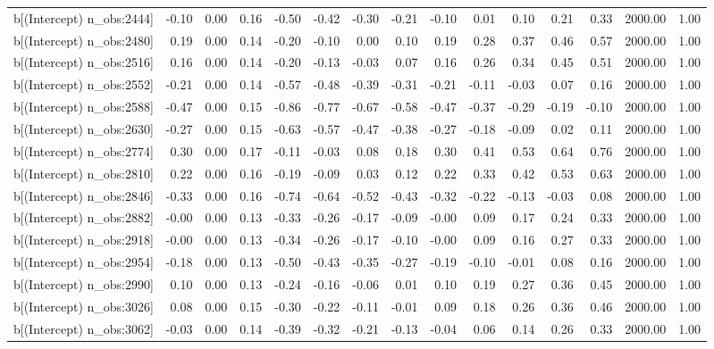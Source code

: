 \begin{table}[ht]
\begin{tabular}{rrrrrrrrrrrrrrr}
  b[(Intercept) n\_obs:2444] & -0.10 & 0.00 & 0.16 & -0.50 & -0.42 & -0.30 & -0.21 & -0.10 & 0.01 & 0.10 & 0.21 & 0.33 & 2000.00 & 1.00 \\ 
  b[(Intercept) n\_obs:2480] & 0.19 & 0.00 & 0.14 & -0.20 & -0.10 & 0.00 & 0.10 & 0.19 & 0.28 & 0.37 & 0.46 & 0.57 & 2000.00 & 1.00 \\ 
  b[(Intercept) n\_obs:2516] & 0.16 & 0.00 & 0.14 & -0.20 & -0.13 & -0.03 & 0.07 & 0.16 & 0.26 & 0.34 & 0.45 & 0.51 & 2000.00 & 1.00 \\ 
  b[(Intercept) n\_obs:2552] & -0.21 & 0.00 & 0.14 & -0.57 & -0.48 & -0.39 & -0.31 & -0.21 & -0.11 & -0.03 & 0.07 & 0.16 & 2000.00 & 1.00 \\ 
  b[(Intercept) n\_obs:2588] & -0.47 & 0.00 & 0.15 & -0.86 & -0.77 & -0.67 & -0.58 & -0.47 & -0.37 & -0.29 & -0.19 & -0.10 & 2000.00 & 1.00 \\ 
  b[(Intercept) n\_obs:2630] & -0.27 & 0.00 & 0.15 & -0.63 & -0.57 & -0.47 & -0.38 & -0.27 & -0.18 & -0.09 & 0.02 & 0.11 & 2000.00 & 1.00 \\ 
  b[(Intercept) n\_obs:2774] & 0.30 & 0.00 & 0.17 & -0.11 & -0.03 & 0.08 & 0.18 & 0.30 & 0.41 & 0.53 & 0.64 & 0.76 & 2000.00 & 1.00 \\ 
  b[(Intercept) n\_obs:2810] & 0.22 & 0.00 & 0.16 & -0.19 & -0.09 & 0.03 & 0.12 & 0.22 & 0.33 & 0.42 & 0.53 & 0.63 & 2000.00 & 1.00 \\ 
  b[(Intercept) n\_obs:2846] & -0.33 & 0.00 & 0.16 & -0.74 & -0.64 & -0.52 & -0.43 & -0.32 & -0.22 & -0.13 & -0.03 & 0.08 & 2000.00 & 1.00 \\ 
  b[(Intercept) n\_obs:2882] & -0.00 & 0.00 & 0.13 & -0.33 & -0.26 & -0.17 & -0.09 & -0.00 & 0.09 & 0.17 & 0.24 & 0.33 & 2000.00 & 1.00 \\ 
  b[(Intercept) n\_obs:2918] & -0.00 & 0.00 & 0.13 & -0.34 & -0.26 & -0.17 & -0.10 & -0.00 & 0.09 & 0.16 & 0.27 & 0.33 & 2000.00 & 1.00 \\ 
  b[(Intercept) n\_obs:2954] & -0.18 & 0.00 & 0.13 & -0.50 & -0.43 & -0.35 & -0.27 & -0.19 & -0.10 & -0.01 & 0.08 & 0.16 & 2000.00 & 1.00 \\ 
  b[(Intercept) n\_obs:2990] & 0.10 & 0.00 & 0.13 & -0.24 & -0.16 & -0.06 & 0.01 & 0.10 & 0.19 & 0.27 & 0.36 & 0.45 & 2000.00 & 1.00 \\ 
  b[(Intercept) n\_obs:3026] & 0.08 & 0.00 & 0.15 & -0.30 & -0.22 & -0.11 & -0.01 & 0.09 & 0.18 & 0.26 & 0.36 & 0.46 & 2000.00 & 1.00 \\ 
  b[(Intercept) n\_obs:3062] & -0.03 & 0.00 & 0.14 & -0.39 & -0.32 & -0.21 & -0.13 & -0.04 & 0.06 & 0.14 & 0.26 & 0.33 & 2000.00 & 1.00 \\ 

\end{tabular}
\end{table}
